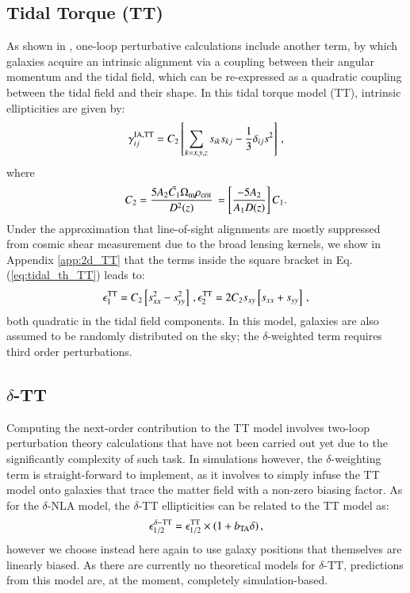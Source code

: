 \documentclass[useAMS,usenatbib]{mn2e}
\begin{document}
\subsection{Tidal Torque (TT)}
\label{subsec:IA_th_TT}

As shown in \citet{Blazek2019}, one-loop perturbative calculations include another term, by which galaxies acquire an intrinsic alignment via a coupling between their angular momentum and the tidal field, which can be re-expressed as a quadratic coupling between the tidal field and their shape. In this tidal torque model (TT), intrinsic ellipticities are given by:
\begin{eqnarray}
\gamma_{ij}^{\rm IA, TT} = C_2 \left[ \sum_{k=x,y,z} s_{ik} s_{kj} -\frac{1}{3} \delta_{ij} s^2 \right] \, ,
\label{eq:tidal_th_TT}
\end{eqnarray}
where 
\begin{eqnarray}
C_2 = \frac{5 A_2 \bar{C_1} \Omega_{\rm m} \rho_{\rm crit}}{D^2(z)} \,  = \left[ \frac{-5 A_2}{A_1 D(z)} \right] C_1.
\end{eqnarray}
Under the approximation that line-of-sight alignments are mostly suppressed from cosmic shear measurement due to the broad lensing kernels, 
we show in  Appendix \ref{app:2d_TT} that the terms inside the square bracket in Eq. (\ref{eq:tidal_th_TT}) leads to:
\begin{eqnarray}
\epsilon_1^{\rm TT} = C_2  \left[ s_{xx}^2 - s_{yy}^2\right] \, , \epsilon_2^{\rm TT} = 2 C_2 s_{xy}\left[s_{xx}+s_{yy}  \right]\, ,
\end{eqnarray}
both quadratic in the tidal field components. In this model, galaxies are also assumed to be randomly distributed on the sky; the $\delta$-weighted term requires third order perturbations.


\subsection{$\delta$-TT}
\label{subsec:IA_th_TT}

Computing the next-order contribution to the TT model involves two-loop perturbation theory calculations that have not been carried out  yet due to the significantly complexity of such task. In simulations however, the $\delta$-weighting term is straight-forward to implement, as it involves to simply infuse the TT model onto galaxies that trace the matter field with a non-zero biasing factor. As for the $\delta$-NLA model, the $\delta$-TT ellipticities can  be related to the TT model as:
\begin{eqnarray}
\epsilon_{1/2}^{\delta-\rm TT} = \epsilon_{1/2}^{\rm TT}\times(1 + b_{\rm TA}\delta) \, ,
\label{eq:tidal_th_deltaTT}
\end{eqnarray}
however we choose instead here again to use galaxy positions that themselves are linearly biased.
As there are currently no theoretical models for $\delta$-TT, predictions from this model are, at the moment, completely simulation-based. 
 
\end{document}
